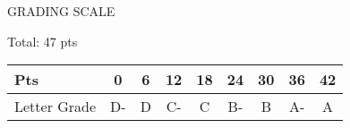 \documentclass[12pt,letterpaper,titlepage]{report}
\begin{document}
\begin{raggedright}
\bigskip
\noindent
GRADING SCALE
\medskip

Total: 47 pts
\bigskip

\def\arraystretch{1.5} 
\begin{tabular}{ | l | c | c | c | c | c | c | c | c | } \hline
Pts          & 0  & 6  & 12 & 18 & 24 & 30 & 36 & 42     \\\hline
Letter Grade & D- & D  & C- & C  & B- & B  & A- & A      \\\hline
\end{tabular}
\end{raggedright}
\end{document}
